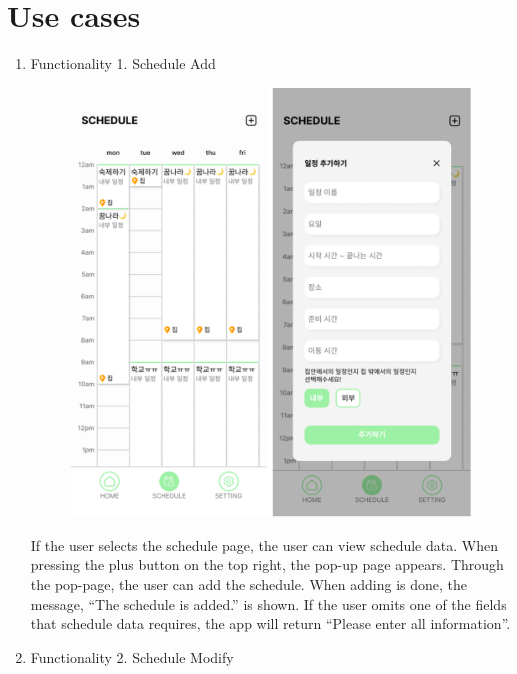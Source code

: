 \documentclass[conference]{IEEEtran}
\begin{document}
\begin{enumerate}[label=\arabic*.]
\begin{enumerate}[label=\arabic*.]
\begin{enumerate}[label=\alph*.]
\begin{enumerate}[label=\roman*.]
        \end{enumerate}
    \end{enumerate}
\end{enumerate}

\section{\Large{Use cases}}
\begin{enumerate}[label=\arabic*.]
    \item {\large{Functionality 1. Schedule Add}} \\
    \begin{figure}[H]\centering\includegraphics[scale=0.4]{images/func1.png}\end{figure} 
    If the user selects the schedule page, the user can view schedule data. When pressing the plus button on the top right, the pop-up page appears. Through the pop-page, the user can add the schedule. When adding is done, the message, “The schedule is added.” is shown. If the user omits one of the fields that schedule data requires, the app will return “Please enter all information”. \\
    \item {\large{Functionality 2. Schedule Modify}} \\

\end{enumerate}
\end{enumerate}
\end{document}
